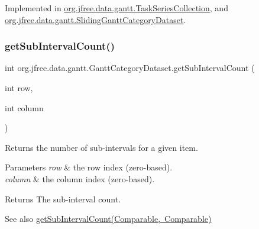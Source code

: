Implemented in \mbox{\hyperlink{classorg_1_1jfree_1_1data_1_1gantt_1_1_task_series_collection_afc8407c3f9a83fb1e637060f678abae6}{org.\+jfree.\+data.\+gantt.\+Task\+Series\+Collection}}, and \mbox{\hyperlink{classorg_1_1jfree_1_1data_1_1gantt_1_1_sliding_gantt_category_dataset_a39f319042a53c0c261816711bf48974b}{org.\+jfree.\+data.\+gantt.\+Sliding\+Gantt\+Category\+Dataset}}.

\mbox{\label{interfaceorg_1_1jfree_1_1data_1_1gantt_1_1_gantt_category_dataset_a290ee496bed2a6688f43e56c0824bb01}} 
\subsubsection{\texorpdfstring{get\+Sub\+Interval\+Count()}{getSubIntervalCount()}\hspace{0.1cm}{\footnotesize\ttfamily [1/2]}}
{\footnotesize\ttfamily int org.\+jfree.\+data.\+gantt.\+Gantt\+Category\+Dataset.\+get\+Sub\+Interval\+Count (\begin{DoxyParamCaption}\item[{int}]{row,  }\item[{int}]{column }\end{DoxyParamCaption})}

Returns the number of sub-\/intervals for a given item.


\begin{DoxyParams}{Parameters}
{\em row} & the row index (zero-\/based). \\
\hline
{\em column} & the column index (zero-\/based).\\
\hline
\end{DoxyParams}
\begin{DoxyReturn}{Returns}
The sub-\/interval count.
\end{DoxyReturn}
\begin{DoxySeeAlso}{See also}
\mbox{\hyperlink{interfaceorg_1_1jfree_1_1data_1_1gantt_1_1_gantt_category_dataset_af4749dc6ab0b5b67535b4ea0fa88f190}{get\+Sub\+Interval\+Count(\+Comparable, Comparable)}} 
\end{DoxySeeAlso}



